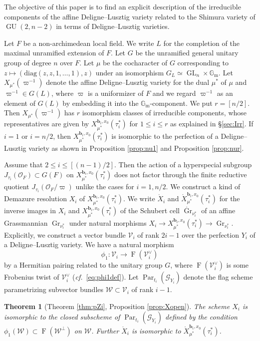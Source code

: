 \documentclass[12pt,a4paper]{article}
\newtheorem{thm}{Theorem}[section]
\DeclareMathOperator{\Gr}{Gr}
\DeclareMathOperator{\Par}{Par}
\DeclareMathOperator{\GL}{GL}
\DeclareMathOperator{\GU}{GU}
\DeclareMathOperator{\oF}{F}
\newcommand{\bfb}{\mathbf{b}}
\newcommand{\cO}{\mathcal{O}}
\newcommand{\sG}{\mathscr{G}}
\newcommand{\sV}{\mathscr{V}}
\newcommand{\sW}{\mathscr{W}}
\newcommand{\Gm}{\mathbb{G}_{\mathrm{m}}}
\newcommand{\cf}{\textit{cf.\ }}
\begin{document}
The objective of this paper is 
to find an explicit description of the irreducible components of the affine Deligne--Lusztig variety related to 
the Shimura variety of $\GU (2,n-2)$ in terms of 
Deligne--Lusztig varieties. 

Let $F$ be a non-archimedean local field. 
We write $L$ for the completion of the maximal unramified extension of 
$F$. 
Let $G$ be the unramified general unitary group of degree $n$ 
over $F$. 
Let $\mu$ be the cocharacter of $G$ 
corresponding to 
$z \mapsto (\mathrm{diag}(z,z,1,\ldots,1),z)$ under an 
isomorphism $G_L \simeq \GL_n \times \Gm$. 
Let $X_{\mu^*}(\varpi^{-1})$ denote the affine Deligne--Lusztig variety 
for the dual $\mu^*$ of $\mu$ and $\varpi^{-1} \in G(L)$, 
where $\varpi$ is a uniformizer of $F$ and we regard $\varpi^{-1}$ as an element of $G(L)$ by embedding it into 
the $\Gm$-component. 
We put $r=[n/2]$. 
Then $X_{\mu^*}(\varpi^{-1})$ has $r$ isomorphism classes of irreducible components, whose representatives are given by $X_{\mu^*}^{\bfb_i,x_0}(\tau_i^*)$ for $1 \leq i \leq r$ as explained in \S \ref{sec:Irr}. 
If $i=1$ or $i=n/2$, then 
$X_{\mu^*}^{\bfb_i,x_0}(\tau_i^*)$ is isomorphic to the perfection of a Deligne--Lusztig variety as shown in 
Proposition \ref{prop:nu1} and Proposition \ref{prop:nur}. 

Assume that $2 \leq i \leq [(n-1)/2]$. 
Then the action of 
a hyperspecial subgroup $J_{\tau_i}(\cO_F) \subset G(F)$ 
on $X_{\mu^*}^{\bfb_i,x_0}(\tau_i^*)$ does not factor through the finite reductive quotient $J_{\tau_i}(\cO_F/\varpi)$ unlike the cases for $i=1,n/2$. 
We construct a kind of Demazure resolution 
$X_i$ of $X_{\mu^*}^{\bfb_i,x_0}(\tau_i^*)$. 
We write $\mathring{X}_i$ and $\mathring{X}_{\mu^*}^{\bfb_i,x_0}(\tau_i^*)$ for the inverse images in 
$X_i$ and $X_{\mu^*}^{\bfb_i,x_0}(\tau_i^*)$ 
of the Schubert cell $\mathring{\Gr}_{\nu_i^*}$ of an affine Grassmannian $\Gr_{\nu_i^*}$ under natural morphisms $X_i \to X_{\mu^*}^{\bfb_i,x_0}(\tau_i^*) \to  \Gr_{\nu_i^*}$. 
Explicitly, we construct a vector bundle 
$\sV_i$ of rank $2i-1$ over the perfection $Y_i$ 
of a Deligne--Lusztig variety. 
We have a natural morphism 
\[
 \phi_1 \colon \sV_i \to \oF (\sV_i^{\vee})
\]
by a Hermitian pairing related to the unitary group $G$, where 
$\oF (\sV_i^{\vee})$ is some Frobenius twist of $\sV_i^{\vee}$ (\cf \eqref{eq:phi1def}). 
Let $\Par_{t_i}(\sG_{Y_i})$ denote the flag scheme 
parametrizing subvector bundles $\sW \subset \sV_i$ 
of rank $i-1$. 


\begin{thm}[Theorem \ref{thm:pZi}, Proposition \ref{prop:Xopen}]\label{thm:IntpYi}
The scheme 
$X_i$ is isomorphic to the closed subscheme of 
$\Par_{t_i}(\sG_{Y_i})$ 
defined by the condition 
$\phi_1 (\sW) \subset \oF (\sW^{\perp})$ 
on $\sW$. 
Further $\mathring{X}_i$ is isomorphic to  $\mathring{X}_{\mu^*}^{\bfb_i,x_0}(\tau_i^*)$. 
\end{thm}
\end{document}
